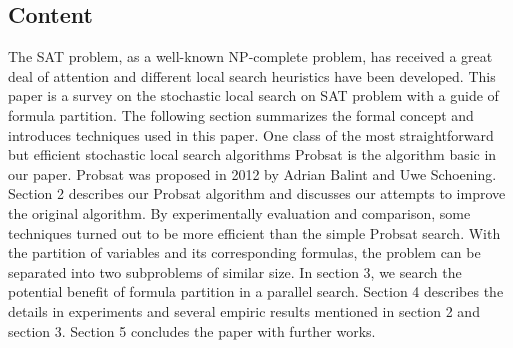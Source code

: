 \documentclass[12pt,a4paper,twoside]{scrartcl}
\numberwithin{equation}{section}
\begin{document}
\subsection{Content} 
The SAT problem, as a well-known NP-complete problem, has received a great deal of attention and different local search heuristics have been developed. This paper is a survey on the stochastic local search on SAT problem with a guide of formula partition. The following section summarizes the formal concept and introduces techniques used in this paper. 
 One class of the most straightforward but efficient stochastic local search algorithms Probsat is the algorithm basic in our paper. Probsat was proposed in 2012 by Adrian Balint and Uwe Schoening. Section 2 describes our Probsat algorithm and discusses our attempts to improve the original algorithm. By experimentally evaluation and comparison, some techniques turned out to be more efficient than the simple Probsat search.
With the partition of variables and its corresponding formulas, the problem can be separated into two subproblems of similar size.  In section 3, we search the potential benefit of formula partition in a parallel search. 
Section 4 describes the details in experiments and several empiric results mentioned in section 2 and section 3.  Section 5 concludes the paper with further works. 
\end{document}
